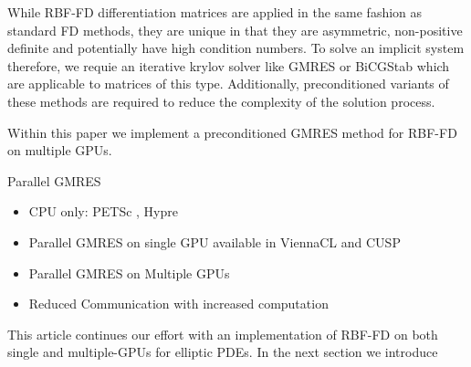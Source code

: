 While RBF-FD differentiation matrices are applied in the same fashion as standard FD methods, they are unique in that they are asymmetric, non-positive definite and potentially have high condition numbers. To solve an implicit system therefore, we requie an iterative krylov solver like GMRES or BiCGStab which are applicable to matrices of this type. Additionally, preconditioned variants of these methods are required to reduce the complexity of the solution process. 

Within this paper we implement a preconditioned GMRES method for RBF-FD on multiple GPUs. 

Parallel GMRES
\begin{itemize} 
	\item CPU only: PETSc \cite{Yokota2010}, Hypre \cite{Wildemann2009} 
	\item Parallel GMRES on single GPU available in ViennaCL \cite{Rupp2010} and CUSP \cite{Cusp2010}
	\item Parallel GMRES on Multiple GPUs \cite{Bahi2011}
	\item Reduced Communication with increased computation \cite{Dekker2000}
\end{itemize} 

This article continues our effort with an implementation of RBF-FD on both single and multiple-GPUs for elliptic PDEs. In the next section we introduce 

%
%
%
%
%
%

